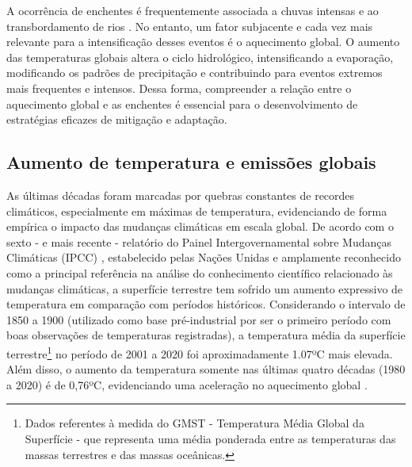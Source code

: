 A ocorrência de enchentes é frequentemente associada a chuvas intensas e ao transbordamento de rios \cite{abbot}. No
entanto, um fator subjacente e cada vez mais relevante para a intensificação desses eventos é o aquecimento global. O
aumento das temperaturas globais altera o ciclo hidrológico, intensificando a evaporação, modificando os padrões de
precipitação e contribuindo para eventos extremos mais frequentes e intensos. Dessa forma, compreender a relação entre o
aquecimento global e as enchentes é essencial para o desenvolvimento de estratégias eficazes de mitigação e adaptação.

\subsection{Aumento de temperatura e emissões globais}

As últimas décadas foram marcadas por quebras constantes de recordes climáticos, especialmente em máximas de
temperatura, evidenciando de forma empírica o impacto das mudanças climáticas em escala global. De acordo com o sexto -
e mais recente - relatório do Painel Intergovernamental sobre Mudanças Climáticas (IPCC) \cite{ipcc_ar6_wg2_chap11},
estabelecido pelas Nações Unidas e amplamente reconhecido como a principal referência na análise do conhecimento
científico relacionado às mudanças climáticas, a superfície terrestre tem sofrido um aumento expressivo de temperatura
em comparação com períodos históricos. Considerando o intervalo de 1850 a 1900 (utilizado como base pré-industrial por
ser o primeiro período com boas observações de temperaturas registradas), a temperatura média da superfície
terrestre\footnote{Dados referentes à medida do GMST - Temperatura Média Global da Superfície - que representa uma média
ponderada entre as temperaturas das massas terrestres e das massas oceânicas.} no período de 2001 a 2020 foi
aproximadamente 1.07ºC mais elevada. Além disso, o aumento da temperatura somente nas últimas quatro décadas (1980 a
2020) é de 0,76ºC, evidenciando uma aceleração no aquecimento global \cite{gulev}.

